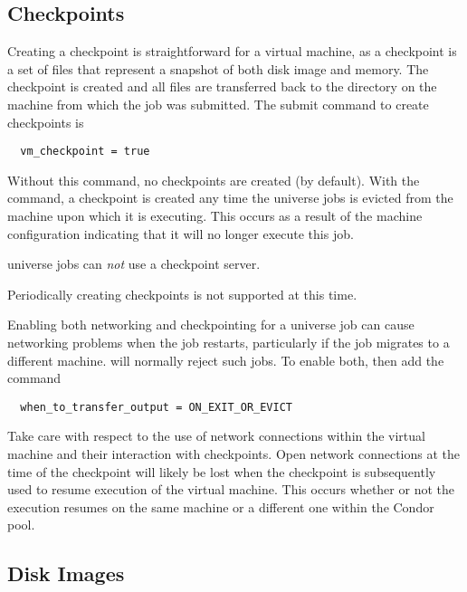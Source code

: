 \subsection{\label{sec:vm-checkpoints}Checkpoints}

Creating a checkpoint is straightforward for a virtual machine,
as a checkpoint is a set of files that represent
a snapshot of both disk image and memory.
The checkpoint is created and all files are transferred back
to the  directory on the machine from which
the job was submitted.
The submit command to create checkpoints is
\begin{verbatim}
  vm_checkpoint = true
\end{verbatim}
Without this command, no checkpoints are created (by default).
With the command, a checkpoint is created any time the 
universe jobs is evicted from the machine upon which it is executing.
This occurs as a result of the machine configuration indicating
that it will no longer execute this job.

 universe jobs can \emph{not} use a checkpoint server.

Periodically creating checkpoints is not supported at this time.

Enabling both networking and checkpointing for a 
universe job can cause networking problems when the job restarts,
particularly if the job migrates to a different machine.
 will normally reject such jobs.
To enable both, then add the command
\begin{verbatim}
  when_to_transfer_output = ON_EXIT_OR_EVICT
\end{verbatim}

Take care with respect to the use of network connections within
the virtual machine and their interaction with checkpoints.
Open network connections at the time of the checkpoint will likely
be lost when the checkpoint is subsequently used to resume execution
of the virtual machine.
This occurs whether or not the execution resumes
on the same machine or a different one within the Condor pool.   

\subsection{\label{sec:vm-disk-image-details}Disk Images}

